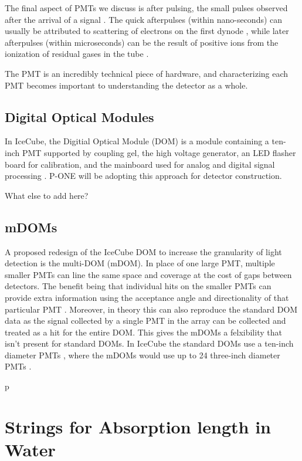 The final aspect of PMTs we discuss is after pulsing, the small pulses observed after the arrival of a signal \cite{ham}. The quick afterpulses (within nano-seconds) can usually be attributed to scattering of electrons on the first dynode \cite{ham}, while later afterpulses (within microseconds) can be the result of positive ions from the ionization of residual gases in the tube \cite{ham}.

The PMT is an incredibly technical piece of hardware, and characterizing each PMT becomes important to understanding the detector as a whole. 

\subsection{Digital Optical Modules}

In IceCube, the Digitial Optical Module (DOM) is a module containing a ten-inch PMT supported by coupling gel, the high voltage generator, an LED flasher board for calibration, and the mainboard used for analog and digital signal processing \cite{icecube_pmt,icecube}. P-ONE will be adopting this approach for detector construction.

What else to add here?

\subsection{mDOMs}

A proposed redesign of the IceCube DOM to increase the granularity of light detection is the multi-DOM (mDOM). In place of one large PMT, multiple smaller PMTs can line the same space and coverage at the cost of gaps between detectors. The benefit being that individual hits on the smaller PMTs can provide extra information using the acceptance angle and directionality of that particular PMT \cite{mpmt}. Moreover, in theory this can also reproduce the standard DOM data as the signal collected by a single PMT in the array can be collected and treated as a hit for the entire DOM. This gives the mDOMs a felxibility that isn't present for standard DOMs. In IceCube the standard DOMs use a ten-inch diameter PMTs \cite{icecube}, where the mDOMs would use up to 24 three-inch diameter PMTs \cite{mpmt}.

p\section{Strings for Absorption length in Water}


